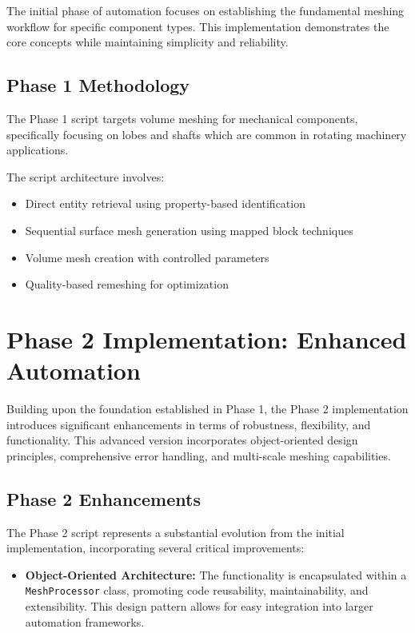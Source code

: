 \documentclass{book}
\begin{document}
\begin{itemize}[leftmargin=*,label=\textbullet]
The initial phase of automation focuses on establishing the fundamental meshing workflow for specific component types. This implementation demonstrates the core concepts while maintaining simplicity and reliability.

\subsection{Phase 1 Methodology}

The Phase 1 script targets volume meshing for mechanical components, specifically focusing on lobes and shafts which are common in rotating machinery applications.

The script architecture involves:
\begin{itemize}[leftmargin=*,label=\textbullet]
    \item Direct entity retrieval using property-based identification
    \item Sequential surface mesh generation using mapped block techniques
    \item Volume mesh creation with controlled parameters
    \item Quality-based remeshing for optimization
\end{itemize}



\section{Phase 2 Implementation: Enhanced Automation}

Building upon the foundation established in Phase 1, the Phase 2 implementation introduces significant enhancements in terms of robustness, flexibility, and functionality. This advanced version incorporates object-oriented design principles, comprehensive error handling, and multi-scale meshing capabilities.

\subsection{Phase 2 Enhancements}

The Phase 2 script represents a substantial evolution from the initial implementation, incorporating several critical improvements:

\begin{itemize}[leftmargin=*,label=\textbullet]
    \item \textbf{Object-Oriented Architecture:} The functionality is encapsulated within a \texttt{MeshProcessor} class, promoting code reusability, maintainability, and extensibility. This design pattern allows for easy integration into larger automation frameworks.
    

\end{itemize}
\end{itemize}
\end{document}
